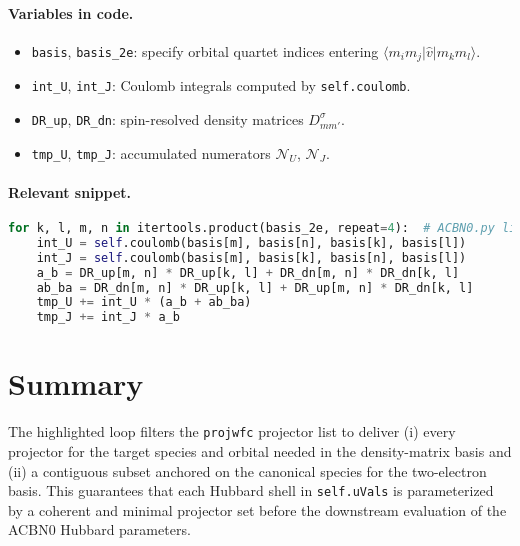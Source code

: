 \documentclass[11pt]{article}
\begin{document}
\paragraph{Variables in code.}
\begin{itemize}[noitemsep]
  \item \verb|basis|, \verb|basis_2e|: specify orbital quartet indices entering $\langle m_i m_j | \hat{v} | m_k m_l \rangle$.
  \item \verb|int_U|, \verb|int_J|: Coulomb integrals computed by \texttt{self.coulomb}.
  \item \verb|DR_up|, \verb|DR_dn|: spin-resolved density matrices $D^{\sigma}_{m m'}$.
  \item \verb|tmp_U|, \verb|tmp_J|: accumulated numerators $\mathcal{N}_U$, $\mathcal{N}_J$.
\end{itemize}
\paragraph{Relevant snippet.}
\begin{lstlisting}[language=python]
for k, l, m, n in itertools.product(basis_2e, repeat=4):  # ACBN0.py lines 826-835
    int_U = self.coulomb(basis[m], basis[n], basis[k], basis[l])
    int_J = self.coulomb(basis[m], basis[k], basis[n], basis[l])
    a_b = DR_up[m, n] * DR_up[k, l] + DR_dn[m, n] * DR_dn[k, l]
    ab_ba = DR_dn[m, n] * DR_up[k, l] + DR_up[m, n] * DR_dn[k, l]
    tmp_U += int_U * (a_b + ab_ba)
    tmp_J += int_J * a_b
\end{lstlisting}

\section{Summary}
The highlighted loop filters the \texttt{projwfc} projector list to deliver (i) every projector for the target species and orbital needed in the density-matrix basis and (ii) a contiguous subset anchored on the canonical species for the two-electron basis. This guarantees that each Hubbard shell in \verb|self.uVals| is parameterized by a coherent and minimal projector set before the downstream evaluation of the ACBN0 Hubbard parameters.
\end{document}
